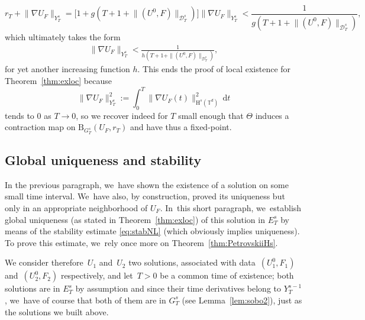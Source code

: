 \documentclass[JEP,XML,SOM,Unicode,published]{cedram}
\theoremstyle{definition}
\newcommand\T{\mathbb{T}}
\newcommand\dd{\mathrm{d}}
\newcommand\B{\mathrm{B}}
\renewcommand\H{\mathrm{H}}
\begin{document}
\[
r_T \!+\! \|\nabla U_F\|_{Y_T^s} = \bigl[1\!+\!g(T\!+\!1\!+\! \| (U^0,F)\| _{\mathcal D_T^{s}})\bigr]\|\nabla U_F\|_{Y_T^s} < \frac{1}{g(T\!+\!1\!+\! \| (U^0,F)\| _{\mathcal D_T^{s}})},
\]
which ultimately takes the form
\begin{align}\label{ineq:ultimate}
\|\nabla U_F\|_{Y_T^s} < \frac{1}{h(T+1+ \| (U^0,F)\| _{\mathcal D_T^{s}})},
\end{align}
for yet another increasing function $h$. This ends the proof of local existence for Theorem~\ref{thm:exloc} because
\[
\|\nabla U_F\|_{Y_T^s}^2:= \int_0^T \|\nabla U_F(t)\|_{\H^s(\T^d)}^2\,\dd t
\]
tends to $0$ as $T\to 0$, so we recover indeed for $T$ small enough that $\Theta$ induces a contraction map on $\B_{G_T^s}(U_F,r_T)$ and have thus a fixed-point.
\subsection{Global uniqueness and stability}
In the previous paragraph, we~have shown the existence of a solution on some small time interval. We~have also, by construction, proved its uniqueness but only in an appropriate neighborhood of $U_F$. In~this short paragraph, we~establish global uniqueness (as stated in Theorem~\ref{thm:exloc}) of this solution in $E_T^s$ by means of the stability estimate \eqref{eq:stabNL} (which obviously implies uniqueness). To prove this estimate, we~rely once more on Theorem~\ref{thm:PetrovskiiHs}.

We consider therefore~$U_1$ and~$U_2$ two solutions, associated with data~$(U_1^0,F_1)$ and~$(U_2^0,F_2)$ respectively, and let~$T>0$ be a common time of existence; both solutions are in $E_T^s$ by assumption and since their time derivatives belong to $Y_T^{s-1}$, we~have of course that both of them are in $G_T^s$ (see Lemma~\ref{lem:sobo2}), just as the solutions we built above.
\end{document}
